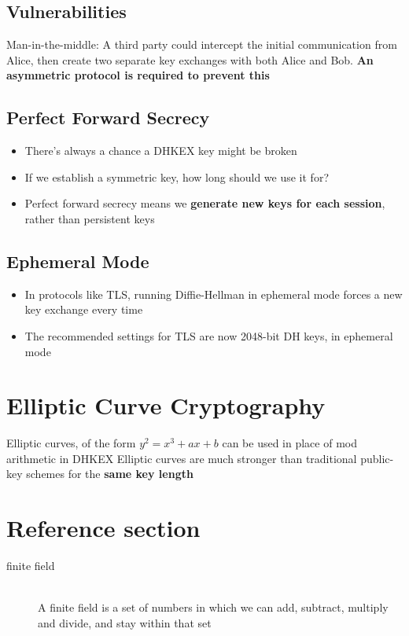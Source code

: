 \documentclass{article}
\begin{document}
\subsection{Vulnerabilities}
\begin{flushleft}
Man-in-the-middle: A third party could intercept the initial communication from Alice, then create two separate key exchanges with both Alice and Bob. \textbf{An asymmetric protocol is required to prevent this}
\end{flushleft}

\subsection{Perfect Forward Secrecy}
\begin{itemize}
  \item There’s always a chance a DHKEX key might be broken 
  \item If we establish a symmetric key, how long should we use it for? 
  \item Perfect forward secrecy means we \textbf{generate new keys for each session}, rather than persistent keys
\end{itemize}

\subsection{Ephemeral Mode}
\begin{itemize}
  \item In protocols like TLS, running Diffie-Hellman in ephemeral mode forces a new key exchange every time 
  \item The recommended settings for TLS are now 2048-bit DH keys, in ephemeral mode
\end{itemize}

\section{Elliptic Curve Cryptography}
\begin{flushleft}
Elliptic curves, of the form $y^2 = x ^3 + ax + b$ can be used in place of mod arithmetic in DHKEX
Elliptic curves are much stronger than traditional public-key schemes for the \textbf{same key length}
\end{flushleft}

\pagebreak

\section*{Reference section} \label{sec:reference}
\begin{description}
	\item[finite field] \hfill \\ A finite field is a set of numbers in which we can add, subtract, multiply and divide, and stay within that set
\end{description}
\end{document}
